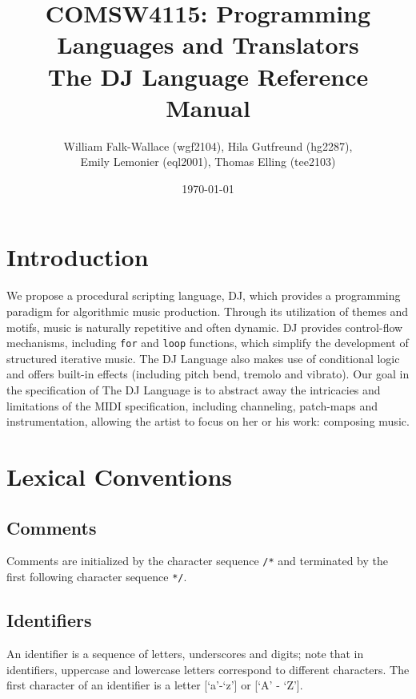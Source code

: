 \documentclass[letterpaper]{article}
\author{William Falk-Wallace (wgf2104), Hila Gutfreund (hg2287), \\Emily Lemonier (eql2001), Thomas Elling (tee2103)}
\title{COMSW4115: Programming Languages and Translators\\The DJ Language Reference Manual}
\date{\today}
\begin{document}
\maketitle
\tableofcontents 
\pagebreak[4]

\section{Introduction}
We propose a procedural scripting language, DJ, which provides a programming paradigm for algorithmic music production. Through its utilization of themes and motifs, music is naturally repetitive and often dynamic. DJ provides control-flow mechanisms, including \texttt{for} and \texttt{loop} functions, which simplify the development of structured iterative music. The DJ Language also makes use of conditional logic and offers built-in effects (including pitch bend, tremolo and vibrato).
Our goal in the specification of The DJ Language is to abstract away the intricacies and limitations of the MIDI specification, including channeling, patch-maps and instrumentation, allowing the artist to focus on her or his work: composing music.

\section{Lexical Conventions}

\subsection{Comments} 
Comments are initialized by the character sequence \texttt{/*} and terminated by the first following character sequence \texttt{*/}.

\subsection{Identifiers}
An identifier is a sequence of letters, underscores and digits; note that in identifiers, uppercase and lowercase letters correspond to different characters. The first character of an identifier is a letter [`a'-`z'] or [`A' - `Z'].
\end{document}
